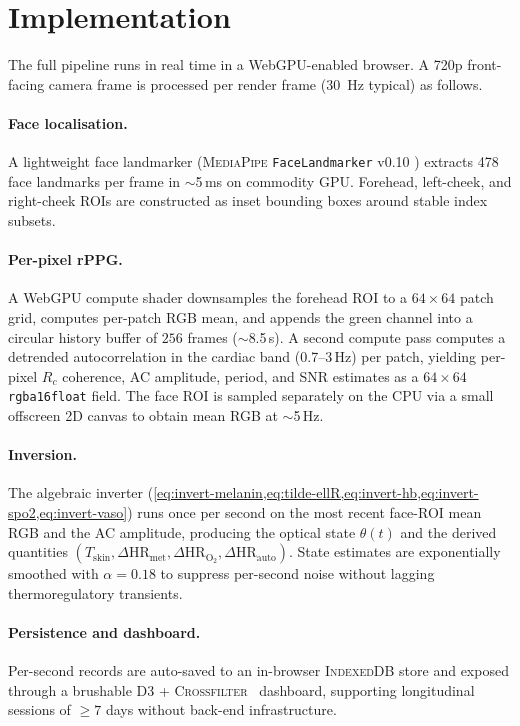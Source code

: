 \documentclass[10pt,twocolumn,a4paper]{article}
\theoremstyle{definition}
\newcommand{\Tskin}{T_{\mathrm{skin}}}
\newcommand{\dHRm}{\Delta\mathrm{HR}_{\mathrm{met}}}
\newcommand{\dHRo}{\Delta\mathrm{HR}_{\mathrm{O_2}}}
\newcommand{\dHRa}{\Delta\mathrm{HR}_{\mathrm{auto}}}
\begin{document}
\section{Implementation}\label{sec:implementation}

The full pipeline runs in real time in a WebGPU-enabled browser. A
720p front-facing camera frame is processed per render frame ($30$~Hz
typical) as follows.

\paragraph{Face localisation.} A lightweight face landmarker
(\textsc{MediaPipe} \texttt{FaceLandmarker} v0.10
\cite{mediapipe2019}) extracts 478 face landmarks per frame in
$\sim$5\,ms on commodity GPU. Forehead, left-cheek, and right-cheek
ROIs are constructed as inset bounding boxes around stable index
subsets.

\paragraph{Per-pixel rPPG.} A WebGPU compute shader downsamples the
forehead ROI to a $64\times 64$ patch grid, computes per-patch RGB
mean, and appends the green channel into a circular history buffer of
$256$ frames ($\sim$8.5\,s). A second compute pass computes a
detrended autocorrelation in the cardiac band (0.7--3\,Hz) per patch,
yielding per-pixel $R_{c}$ coherence, AC amplitude, period, and SNR
estimates as a $64\times 64$ \texttt{rgba16float} field. The face
ROI is sampled separately on the CPU via a small offscreen 2D canvas
to obtain mean RGB at $\sim$5\,Hz.

\paragraph{Inversion.} The algebraic inverter
(\cref{eq:invert-melanin,eq:tilde-ellR,eq:invert-hb,eq:invert-spo2,eq:invert-vaso})
runs once per second on the most recent face-ROI mean RGB and the AC
amplitude, producing the optical state $\theta(t)$ and the derived
quantities $(\Tskin, \dHRm, \dHRo, \dHRa)$. State estimates are
exponentially smoothed with $\alpha=0.18$ to suppress per-second
noise without lagging thermoregulatory transients.

\paragraph{Persistence and dashboard.} Per-second records are
auto-saved to an in-browser \textsc{IndexedDB} store and exposed
through a brushable \textsc{D3} + \textsc{Crossfilter}~\cite{bostock2011d3}
dashboard, supporting longitudinal sessions of $\geq 7$ days
without back-end infrastructure.
\end{document}
